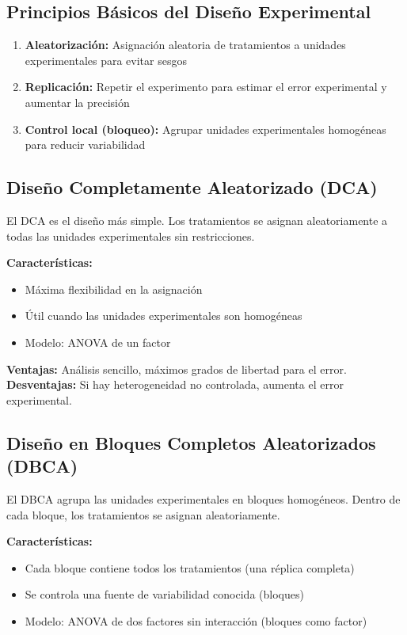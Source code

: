 \documentclass[11pt,a4paper]{article}
\theoremstyle{definition}
\begin{document}
\subsection{Principios Básicos del Diseño Experimental}

\begin{enumerate}
    \item \textbf{Aleatorización:} Asignación aleatoria de tratamientos a unidades experimentales para evitar sesgos
    \item \textbf{Replicación:} Repetir el experimento para estimar el error experimental y aumentar la precisión
    \item \textbf{Control local (bloqueo):} Agrupar unidades experimentales homogéneas para reducir variabilidad
\end{enumerate}

\subsection{Diseño Completamente Aleatorizado (DCA)}

El DCA es el diseño más simple. Los tratamientos se asignan aleatoriamente a todas las unidades experimentales sin restricciones.

\textbf{Características:}
\begin{itemize}
    \item Máxima flexibilidad en la asignación
    \item Útil cuando las unidades experimentales son homogéneas
    \item Modelo: ANOVA de un factor
\end{itemize}

\textbf{Ventajas:} Análisis sencillo, máximos grados de libertad para el error. \\
\textbf{Desventajas:} Si hay heterogeneidad no controlada, aumenta el error experimental.

\subsection{Diseño en Bloques Completos Aleatorizados (DBCA)}

El DBCA agrupa las unidades experimentales en bloques homogéneos. Dentro de cada bloque, los tratamientos se asignan aleatoriamente.

\textbf{Características:}
\begin{itemize}
    \item Cada bloque contiene todos los tratamientos (una réplica completa)
    \item Se controla una fuente de variabilidad conocida (bloques)
    \item Modelo: ANOVA de dos factores sin interacción (bloques como factor)
\end{itemize}
\end{document}
